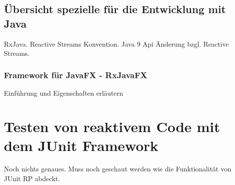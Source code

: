 \subsection{Übersicht spezielle für die Entwicklung mit Java}
RxJava. Reactive Streams Konvention. Java 9 Api Änderung bzgl. Reactive Streams.
\subsubsection{Framework für JavaFX - RxJavaFX}
Einführung und Eigenschaften erläutern
\section{Testen von reaktivem Code mit dem JUnit Framework}
Noch nichts genaues. Muss noch geschaut werden wie die Funktionalität von JUnit RP abdeckt.